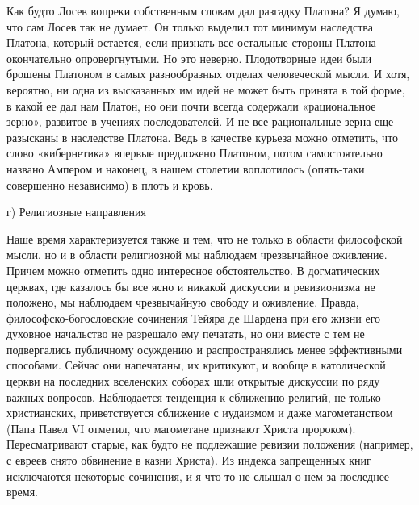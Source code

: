 Как  будто  Лосев вопреки  собственным  словам  дал разгадку  Платона?
Я  думаю,  что  сам  Лосев  так  не  думает.  Он  только  выделил  тот
минимум  наследства  Платона,  который  остается,  если  признать  все
остальные стороны Платона окончательно опровергнутыми. Но это неверно.
Плодотворные идеи были брошены  Платоном в самых разнообразных отделах
человеческой мысли. И  хотя, вероятно, ни одна из  высказанных им идей
не  может  быть принята  в  той  форме, в  какой  ее  дал нам  Платон,
но  они  почти  всегда  содержали  «рациональное  зерно»,  развитое  в
учениях последователей.  И не все  рациональные зерна еще  разысканы в
наследстве  Платона.  Ведь  в  качестве курьеза  можно  отметить,  что
слово «кибернетика» впервые  предложено Платоном, потом самостоятельно
названо Ампером  и наконец,  в нашем столетии  воплотилось (опять-таки
совершенно независимо) в плоть и кровь.

г) Религиозные направления

Наше  время характеризуется  также  и  тем, что  не  только в  области
философской   мысли,  но   и  в   области  религиозной   мы  наблюдаем
чрезвычайное   оживление.  Причем   можно  отметить   одно  интересное
обстоятельство.  В догматических  церквах,  где казалось  бы все  ясно
и  никакой   дискуссии  и  ревизионизма  не   положено,  мы  наблюдаем
чрезвычайную  свободу  и  оживление.  Правда,  философско-богословские
сочинения Тейяра де  Шардена при его жизни его  духовное начальство не
разрешало ему печатать, но они вместе с тем не подвергались публичному
осуждению и распространялись менее  эффективными способами. Сейчас они
напечатаны, их критикуют, и вообще  в католической церкви на последних
вселенских  соборах шли  открытые дискуссии  по ряду  важных вопросов.
Наблюдается  тенденция к  сближению религий,  не только  христианских,
приветствуется сближение с иудаизмом и даже магометанством (Папа Павел
VI отметил,  что магометане признают Христа  пророком). Пересматривают
старые,  как  будто  не  подлежащие  ревизии  положения  (например,  с
евреев снято  обвинение в казни  Христа). Из индекса  запрещенных книг
исключаются  некоторые  сочинения, и  я  что-то  не  слышал о  нем  за
последнее время.

